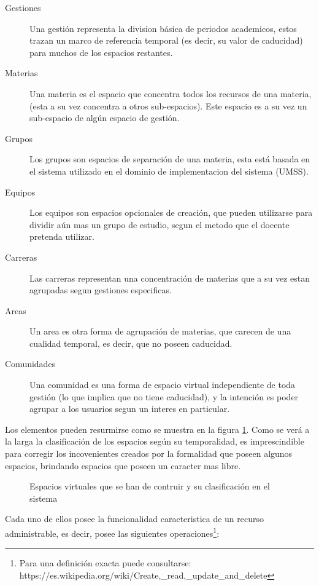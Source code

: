 \begin{description}
\item [Gestiones] Una gestión representa la division básica de periodos
academicos, estos trazan un marco de referencia temporal (es decir, su valor de
caducidad) para muchos de los espacios restantes.
\item [Materias] Una materia es el espacio que concentra todos los recursos de
una materia, (esta a su vez concentra a otros sub-espacios). Este espacio es a
su vez un sub-espacio de algún espacio de gestión.
\item [Grupos] Los grupos son espacios de separación de una materia, esta está
basada en el sistema utilizado en el dominio de implementacion del sistema
(UMSS).
\item [Equipos] Los equipos son espacios opcionales de creación, que pueden
utilizarse para dividir aún mas un grupo de estudio, segun el metodo que el
docente pretenda utilizar.
\item [Carreras] Las carreras representan una concentración de materias que a su
vez estan agrupadas segun gestiones especificas.
\item [Areas] Un area es otra forma de agrupación de materias, que carecen de
una cualidad temporal, es decir, que no poseen caducidad.
\item [Comunidades] Una comunidad es una forma de espacio virtual independiente
de toda gestión (lo que implica que no tiene caducidad), y la intención es poder
agrupar a los usuarios segun un interes en particular.
\end{description}

Los elementos pueden resurmirse como se muestra en la figura \ref{espacios}.
Como se verá a la larga la clasificación de los espacios según su temporalidad,
es imprescindible para corregir los incovenientes creados por la formalidad que
poseen algunos espacios, brindando espacios que poseen un caracter mas libre.

\begin{figure}
\centering

\caption{Espacios virtuales que se han de contruir y su clasificación en el
sistema}
\label{espacios}
\end{figure}

Cada uno de ellos posee la funcionalidad caracteristica de un recurso
administrable, es decir, posee las siguientes operaciones\footnote{Para una
definición exacta puede consultarse:
https://es.wikipedia.org/wiki/Create,\_read,\_update\_and\_delete}:

